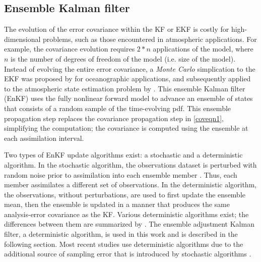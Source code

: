 \subsection{Ensemble Kalman filter}
The evolution of the error covariance within the KF or EKF is costly for high-dimensional problems, such as those encountered in atmospheric applications. For example, the covariance evolution requires \(2*n\) applications of the model, where \(n\) is the number of degrees of freedom of the model (i.e. size of the model). Instead of evolving the entire error covariance, a {\it Monte Carlo} simplication to the EKF was proposed by \citet{evensen94} for oceanographic applications, and subsequently applied to the atmospheric state estimation problem by \citet{houtekamermitchell98}. This ensemble Kalman filter (EnKF) uses the fully nonlinear forward model to advance an ensemble of states that consists of a random sample of the time-evolving pdf. This ensemble propagation step replaces the covariance propagation step in \ref{coveqn1}, simplifying the computation; the covariance is computed using the ensemble at each assimilation interval. 

Two types of EnKF update algorithms exist: a stochastic and a deterministic algorithm. In the stochastic algorithm, the observations dataset is perturbed with random noise prior to assimilation into each ensemble member \citep{houtekamermitchell98,hamillsnyder02}. Thus, each member assimilates a different set of observations. In the deterministic algorithm, the observations, without perturbations, are used to first update the ensemble mean, then the ensemble is updated in a manner that produces the same analysis-error covariance as the KF. Various deterministic algorithms exist; the differences between them are summarized by \citet{tippett03}. The ensemble adjustment Kalman filter, a deterministic algorithm, is used in this work and is described in the following section. Most recent studies use deterministic algorithms due to the additional source of sampling error that is introduced by stochastic algorithms \citep{whitakerhamill02}.

